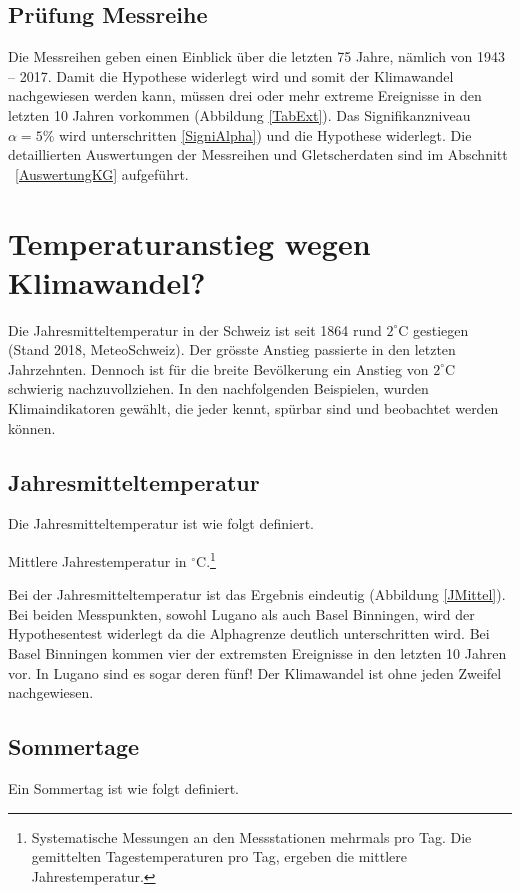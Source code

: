 \begin{refsection}
\subsection{Prüfung Messreihe}
Die Messreihen geben einen Einblick über die letzten 75 Jahre, nämlich von 1943 -- 2017. Damit die Hypothese widerlegt wird und somit der Klimawandel nachgewiesen werden kann, müssen drei oder mehr extreme Ereignisse in den letzten 10 Jahren vorkommen (Abbildung \ref{TabExt}). Das Signifikanzniveau $\alpha = 5\%$ wird unterschritten \ref{SigniAlpha}) und die Hypothese widerlegt.
Die detaillierten Auswertungen der Messreihen und Gletscherdaten sind im Abschnitt ~\ref{AuswertungKG} aufgeführt.


\section{Temperaturanstieg wegen Klimawandel?}
Die Jahresmitteltemperatur in der Schweiz ist seit 1864 rund $2^{\circ}$C gestiegen (Stand 2018, MeteoSchweiz). Der grösste Anstieg passierte in den letzten Jahrzehnten. Dennoch ist für die breite Bevölkerung ein Anstieg von $2^{\circ}$C schwierig nachzuvollziehen.
In den nachfolgenden Beispielen, wurden Klimaindikatoren gewählt, die jeder kennt, spürbar sind und beobachtet werden können.

\subsection{Jahresmitteltemperatur}
Die Jahresmitteltemperatur ist wie folgt definiert.

\begin{definition}
Mittlere Jahrestemperatur in $^{\circ}$C.\footnote{%
Systematische Messungen an den Messstationen mehrmals pro Tag. Die gemittelten Tagestemperaturen pro Tag, ergeben die mittlere Jahrestemperatur.}
\end{definition}

Bei der Jahresmitteltemperatur ist das Ergebnis eindeutig (Abbildung \ref{JMittel}). Bei beiden Messpunkten, sowohl Lugano als auch Basel Binningen, wird der Hypothesentest widerlegt da die Alphagrenze deutlich unterschritten wird. Bei Basel Binningen kommen vier der extremsten Ereignisse in den letzten 10 Jahren vor. In Lugano sind es sogar deren fünf! Der Klimawandel ist ohne jeden Zweifel nachgewiesen.


\subsection{Sommertage}
Ein Sommertag ist wie folgt definiert.


\end{refsection}
